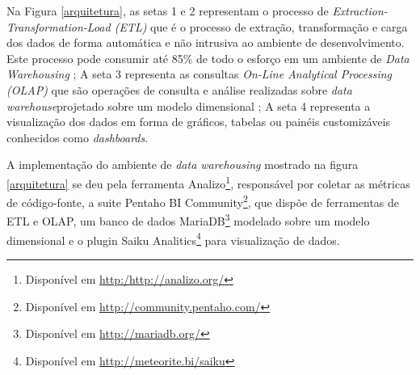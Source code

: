 Na Figura \ref{arquitetura}, as setas 1 e 2 representam o processo de \textit{Extraction-Transformation-Load (ETL)} que é o processo de extração, transformação e carga dos dados de forma automática e não intrusiva ao ambiente de desenvolvimento. Este processo pode consumir até 85\% de todo o esforço em um ambiente de \textit{Data Warehousing} \cite{Kimball2002}; A seta 3 representa as consultas \textit{On-Line Analytical Processing (OLAP)} que são operações de consulta e análise realizadas sobre \textit{data warehouse}projetado sobre um modelo dimensional \cite{Kimball2002} \cite{Codd1993}; A seta 4 representa a visualização dos dados em forma de gráficos, tabelas ou painéis customizáveis conhecidos como \textit{dashboards}.


A implementação do ambiente de \textit{data warehousing} mostrado na figura \ref{arquitetura} se deu pela ferramenta Analizo\footnote{Disponível em \url{http:/http://analizo.org/}}, responsável por coletar as métricas de código-fonte, a suite Pentaho BI Community\footnote{Disponível em \url{http://community.pentaho.com/}}, que dispõe de ferramentas de ETL e OLAP, um banco de dados MariaDB\footnote{Disponível em \url{http://mariadb.org/}} modelado sobre um modelo dimensional e o plugin Saiku Analitics\footnote{Disponível em \url{http://meteorite.bi/saiku}} para visualização de dados. 